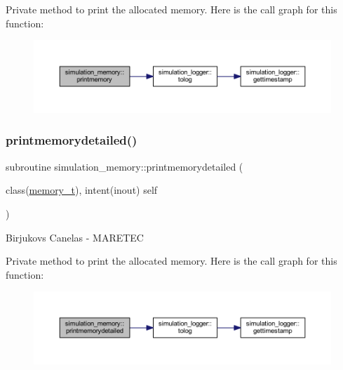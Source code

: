 Private method to print the allocated memory. Here is the call graph for this function\+:\nopagebreak
\begin{figure}[H]
\begin{center}
\leavevmode
\includegraphics[width=350pt]{namespacesimulation__memory_a5827bef8479b809a453af147ceaa8c7c_cgraph}
\end{center}
\end{figure}
\mbox{\label{namespacesimulation__memory_af2a472000acc1ff59cb6e63679617699}} 
\subsubsection{\texorpdfstring{printmemorydetailed()}{printmemorydetailed()}}
{\footnotesize\ttfamily subroutine simulation\+\_\+memory\+::printmemorydetailed (\begin{DoxyParamCaption}\item[{class(\hyperlink{structsimulation__memory_1_1memory__t}{memory\+\_\+t}), intent(inout)}]{self }\end{DoxyParamCaption})\hspace{0.3cm}{\ttfamily [private]}}



Birjukovs Canelas -\/ M\+A\+R\+E\+T\+EC 

Private method to print the allocated memory. Here is the call graph for this function\+:\nopagebreak
\begin{figure}[H]
\begin{center}
\leavevmode
\includegraphics[width=350pt]{namespacesimulation__memory_af2a472000acc1ff59cb6e63679617699_cgraph}
\end{center}
\end{figure}



